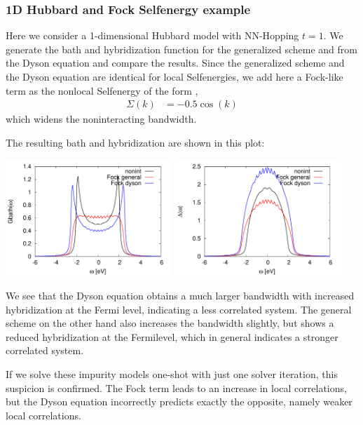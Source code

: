 \documentclass[12pt,a4paper]{scrartcl}
\numberwithin{equation}{section}
\begin{document}
\subsubsection{1D Hubbard and Fock Selfenergy example}
Here we consider a 1-dimensional Hubbard model with NN-Hopping $t=1$. We generate the bath 
and hybridization function for the generalized scheme and from the Dyson equation 
and compare the results. Since the generalized scheme and the Dyson equation
are identical for local Selfenergies, we add here a Fock-like term as the nonlocal
Selfenergy of the form ,
\begin{align}
 \Sigma(k) &= -0.5 \cos(k)
\end{align}
which widens the noninteracting bandwidth.

The resulting bath and hybridization are shown in this plot:

\includegraphics[width=0.47\textwidth]{figs/bathNonlocFromDMFTderiv/1dhub_bath_sigk.pdf}
\includegraphics[width=0.47\textwidth]{figs/bathNonlocFromDMFTderiv/1dhub_hyb_sigk.pdf}

We see that the Dyson equation obtains a much larger bandwidth with increased hybridization 
at the Fermi level, indicating a less correlated system.
The general scheme on the other hand also increases the bandwidth slightly, but
shows a reduced hybridization at the Fermilevel, which in general indicates a stronger correlated system.

If we solve these impurity models one-shot with just one solver iteration, this 
suspicion is confirmed. The Fock term leads to an increase in local correlations,
but the Dyson equation incorrectly predicts exactly the opposite, namely weaker local correlations.
\end{document}
